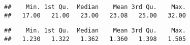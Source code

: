 \documentclass[
]{article}
\newenvironment{Shaded}{\begin{snugshade}}{\end{snugshade}}
\newcommand{\FunctionTok}[1]{\textcolor[rgb]{0.00,0.00,0.00}{#1}}
\newcommand{\NormalTok}[1]{#1}
\newcommand{\OtherTok}[1]{\textcolor[rgb]{0.56,0.35,0.01}{#1}}
\newcommand{\SpecialCharTok}[1]{\textcolor[rgb]{0.00,0.00,0.00}{#1}}
\begin{document}
\begin{Shaded}
\end{Shaded}

\begin{verbatim}
##    Min. 1st Qu.  Median    Mean 3rd Qu.    Max. 
##   17.00   21.00   23.00   23.08   25.00   32.00
\end{verbatim}

\begin{Shaded}
\end{Shaded}

\begin{verbatim}
##    Min. 1st Qu.  Median    Mean 3rd Qu.    Max. 
##   1.230   1.322   1.362   1.360   1.398   1.505
\end{verbatim}
\end{document}
